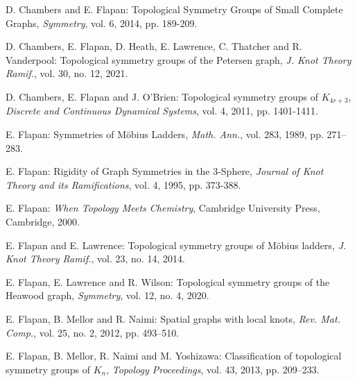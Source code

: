 \documentclass[11]{amsart}
\theoremstyle{definition}
\theoremstyle{remark}
\begin{document}
\small
\begin{thebibliography}{10}

 D. Chambers and E. Flapan: Topological Symmetry Groups of Small Complete Graphs, {\it Symmetry}, vol. 6, 2014, pp. 189-209.


 D. Chambers, E. Flapan, D. Heath, E. Lawrence, C. Thatcher and R. Vanderpool: Topological symmetry groups of the Petersen graph, {\it J. Knot Theory Ramif.}, vol. 30, no. 12, 2021.

 D. Chambers, E. Flapan and J. O'Brien: Topological symmetry groups of $K_{4r+3}$, {\it Discrete and Continuous Dynamical Systems}, vol. 4, 2011, pp. 1401-1411.




 E. Flapan: Symmetries of M\"{o}bius Ladders, {\it Math. Ann.}, vol. 283, 1989, pp. 271--283.

 E. Flapan: Rigidity of Graph Symmetries in the 3-Sphere, {\it Journal of Knot Theory and its Ramifications}, vol. 4, 1995, pp. 373-388. 

 E. Flapan: {\it When Topology Meets Chemistry}, Cambridge University Press, Cambridge, 2000.

 E. Flapan and E. Lawrence: Topological symmetry groups of M\"{o}bius ladders, {\it J. Knot Theory Ramif.}, vol. 23, no. 14, 2014.

 E. Flapan, E. Lawrence and R. Wilson: Topological symmetry groups of the Heawood graph, {\it Symmetry}, vol. 12, no. 4, 2020.


 E. Flapan, B. Mellor and R. Naimi:  Spatial graphs with local knots, {\it Rev. Mat. Comp.}, vol. 25, no. 2, 2012, pp. 493--510.


 E. Flapan, B. Mellor, R. Naimi and M. Yoshizawa: Classification of topological symmetry groups of $K_n$, {\it Topology Proceedings}, vol. 43, 2013, pp. 209--233.


\end{thebibliography}
\end{document}
